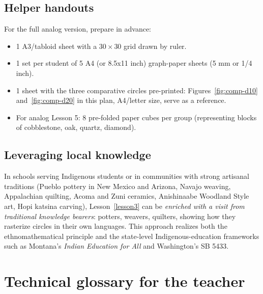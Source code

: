 \documentclass[12pt,a4paper]{scrartcl}
\begin{document}
\subsection{Helper handouts}
For the full analog version, prepare in advance:
\begin{itemize}[leftmargin=1.3em,itemsep=0.1em,topsep=0.2em,nosep]
  \item 1 A3/tabloid sheet with a $30 \times 30$ grid drawn by ruler.
  \item 1 set per student of 5 A4 (or 8.5x11 inch) graph-paper sheets (5 mm or 1/4 inch).
  \item 1 sheet with the three comparative circles pre-printed: Figures~\ref{fig:comp-d10} and~\ref{fig:comp-d20} in this plan, A4/letter size, serve as a reference.
  \item For analog Lesson 5: 8 pre-folded paper cubes per group (representing blocks of cobblestone, oak, quartz, diamond).
\end{itemize}

\subsection{Leveraging local knowledge}
In schools serving Indigenous students or in communities with strong artisanal traditions (Pueblo pottery in New Mexico and Arizona, Navajo weaving, Appalachian quilting, Acoma and Zuni ceramics, Anishinaabe Woodland Style art, Hopi katsina carving), Lesson~\ref{lesson3} can be \emph{enriched with a visit from traditional knowledge bearers}: potters, weavers, quilters, showing how they rasterize circles in their own languages. This approach realizes both the ethnomathematical principle and the state-level Indigenous-education frameworks such as Montana's \emph{Indian Education for All} and Washington's SB 5433.

\newpage
\section{Technical glossary for the teacher}\label{ap:glos}
\end{document}
